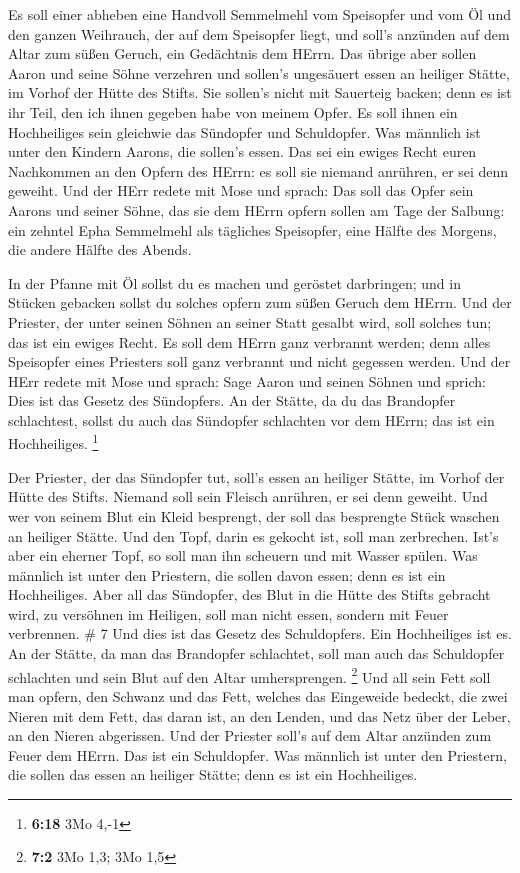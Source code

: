  Es soll einer abheben eine Handvoll Semmelmehl vom
Speisopfer und vom Öl und den ganzen Weihrauch, der auf dem Speisopfer
liegt, und soll's anzünden auf dem Altar zum süßen Geruch, ein
Gedächtnis dem HErrn.  Das übrige aber sollen Aaron und
seine Söhne verzehren und sollen's ungesäuert essen an heiliger Stätte,
im Vorhof der Hütte des Stifts.  Sie sollen's nicht mit
Sauerteig backen; denn es ist ihr Teil, den ich ihnen gegeben habe von
meinem Opfer. Es soll ihnen ein Hochheiliges sein gleichwie das
Sündopfer und Schuldopfer.  Was männlich ist unter den
Kindern Aarons, die sollen's essen. Das sei ein ewiges Recht euren
Nachkommen an den Opfern des HErrn: es soll sie niemand anrühren, er sei
denn geweiht.  Und der HErr redete mit Mose und sprach:
 Das soll das Opfer sein Aarons und seiner Söhne, das sie
dem HErrn opfern sollen am Tage der Salbung: ein zehntel Epha Semmelmehl
als tägliches Speisopfer, eine Hälfte des Morgens, die andere Hälfte des
Abends.

 In der Pfanne mit Öl sollst du es machen und geröstet
darbringen; und in Stücken gebacken sollst du solches opfern zum süßen
Geruch dem HErrn.  Und der Priester, der unter seinen
Söhnen an seiner Statt gesalbt wird, soll solches tun; das ist ein
ewiges Recht. Es soll dem HErrn ganz verbrannt werden; 
denn alles Speisopfer eines Priesters soll ganz verbrannt und nicht
gegessen werden.  Und der HErr redete mit Mose und sprach:
 Sage Aaron und seinen Söhnen und sprich: Dies ist das
Gesetz des Sündopfers. An der Stätte, da du das Brandopfer schlachtest,
sollst du auch das Sündopfer schlachten vor dem HErrn; das ist ein
Hochheiliges. \footnote{\textbf{6:18} 3Mo 4,-1}

 Der Priester, der das Sündopfer tut, soll's essen an
heiliger Stätte, im Vorhof der Hütte des Stifts.  Niemand
soll sein Fleisch anrühren, er sei denn geweiht. Und wer von seinem Blut
ein Kleid besprengt, der soll das besprengte Stück waschen an heiliger
Stätte.  Und den Topf, darin es gekocht ist, soll man
zerbrechen. Ist's aber ein eherner Topf, so soll man ihn scheuern und
mit Wasser spülen.  Was männlich ist unter den Priestern,
die sollen davon essen; denn es ist ein Hochheiliges.  Aber
all das Sündopfer, des Blut in die Hütte des Stifts gebracht wird, zu
versöhnen im Heiligen, soll man nicht essen, sondern mit Feuer
verbrennen. \# 7  Und dies ist das Gesetz des Schuldopfers.
Ein Hochheiliges ist es.  An der Stätte, da man das
Brandopfer schlachtet, soll man auch das Schuldopfer schlachten und sein
Blut auf den Altar umhersprengen. \footnote{\textbf{7:2} 3Mo 1,3; 3Mo
  1,5}  Und all sein Fett soll man opfern, den Schwanz und
das Fett, welches das Eingeweide bedeckt,  die zwei Nieren
mit dem Fett, das daran ist, an den Lenden, und das Netz über der Leber,
an den Nieren abgerissen.  Und der Priester soll's auf dem
Altar anzünden zum Feuer dem HErrn. Das ist ein Schuldopfer.
 Was männlich ist unter den Priestern, die sollen das essen
an heiliger Stätte; denn es ist ein Hochheiliges.

